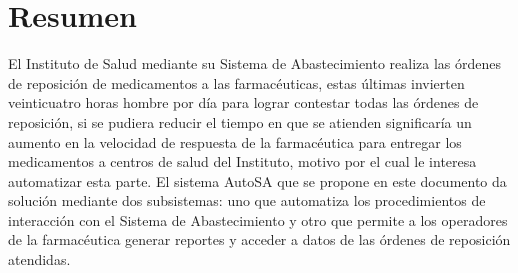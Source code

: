 \section{Resumen}
El Instituto de Salud mediante su Sistema de Abastecimiento realiza las órdenes de reposición de medicamentos a las farmacéuticas, estas últimas invierten veinticuatro horas hombre por día para lograr contestar todas las órdenes de reposición, si se pudiera reducir el tiempo en que se atienden significaría un aumento en la velocidad de respuesta de la farmacéutica para entregar los medicamentos a centros de salud del Instituto, motivo por el cual le interesa automatizar esta parte. El sistema AutoSA que se propone en este documento da solución mediante dos subsistemas: uno que automatiza los procedimientos de interacción con el Sistema de Abastecimiento y otro que permite a los operadores de la farmacéutica generar reportes y acceder a datos de las órdenes de reposición atendidas.